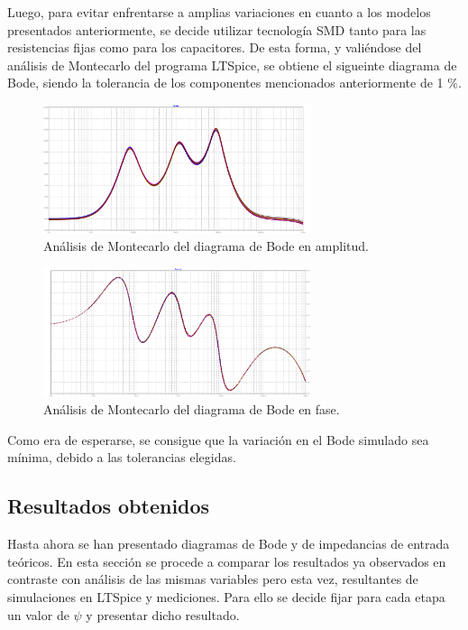 Luego, para evitar enfrentarse a amplias variaciones en cuanto a los modelos presentados anteriormente, se decide utilizar tecnología SMD tanto para las resistencias fijas como para los capacitores. De esta forma, y valiéndose del análisis de Montecarlo del programa LTSpice, se obtiene el sigueinte diagrama de Bode, siendo la tolerancia de los componentes mencionados anteriormente de 1 \%.

\begin{figure}[H]	
	\centering
	\includegraphics[width=0.7\textwidth]{Imagenes/MC-Mod.png}
	\caption{Análisis de Montecarlo del diagrama de Bode en amplitud.}
	\label{fig:MC-Mod}
\end{figure}

\begin{figure}[H]	
	\centering
	\includegraphics[width=0.7\textwidth]{Imagenes/MC-Ph.png}
	\caption{Análisis de Montecarlo del diagrama de Bode en fase.}
	\label{fig:MC-Ph}
\end{figure}

Como era de esperarse, se consigue que la variación en el Bode simulado sea mínima, debido a las tolerancias elegidas.

\subsection{Resultados obtenidos}

Hasta ahora se han presentado diagramas de Bode y de impedancias de entrada teóricos. En esta sección se procede a comparar los resultados ya observados en contraste con análisis de las mismas variables pero esta vez, resultantes de simulaciones en LTSpice y mediciones. Para ello se decide fijar para cada etapa un valor de $\psi$ y presentar dicho resultado.

